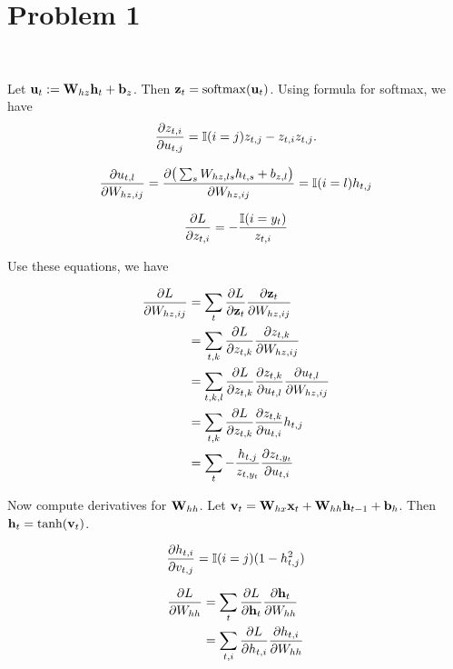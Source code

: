 \section{Problem 1}~\label{sec:prob1}

Let ${\mathbf{u}}_t:={\mathbf{W}}_{hz}{\mathbf{h}}_t+{\mathbf{b}}_z$.
Then ${\mathbf{z}}_t={\mathop{\mathrm{softmax}}}({\mathbf{u}}_t)$.
Using formula for softmax, we have
\begin{equation}
    \frac{\partial z_{t,i}}{\partial u_{t,j}} = {\mathbb{I}}(i=j)z_{t,j}-z_{t,i}z_{t,j}.
\end{equation}

\begin{equation}
    \frac{\partial u_{t,l}}{\partial W_{hz,ij}}
        = \frac{\partial \big(\sum_s W_{hz,ls}h_{t,s}+b_{z,l}\big)}{\partial W_{hz,ij}}
        = {\mathbb{I}}(i=l)h_{t,j}
\end{equation}

\begin{equation}
    \frac{\partial L}{\partial z_{t,i}}= -\frac{{\mathbb{I}}(i=y_t)}{z_{t,i}}
\end{equation}

Use these equations, we have

\begin{equation}
\begin{split}
    \frac{\partial L}{\partial W_{hz,ij}}
        &= \sum_t \frac{\partial L}{\partial {\mathbf{z}}_t} \frac{\partial {\mathbf{z}}_t}{\partial W_{hz,ij}} \\
        &= \sum_{t,k} \frac{\partial L}{\partial z_{t,k}} \frac{\partial z_{t,k}}{\partial W_{hz,ij}} \\
        &= \sum_{t,k,l} \frac{\partial L}{\partial z_{t,k}} \frac{\partial z_{t,k}}{\partial u_{t,l}}\frac{\partial u_{t,l}}{\partial W_{hz,ij}} \\
        &= \sum_{t,k} \frac{\partial L}{\partial z_{t,k}} \frac{\partial z_{t,k}}{\partial u_{t,i}}h_{t,j} \\
        &= \sum_{t} -\frac{h_{t,j}}{z_{t,y_t}} \frac{\partial z_{t,{y_t}}}{\partial u_{t,i}} \\
\end{split}
\end{equation}

Now compute derivatives for ${\mathbf{W}}_{hh}$.
Let ${\mathbf{v}}_t={\mathbf{W}}_{hx}{\mathbf{x}}_t+{\mathbf{W}}_{hh}{\mathbf{h}}_{t-1}+{\mathbf{b}}_h$.
Then ${\mathbf{h}}_t=\tanh({\mathbf{v}}_t)$.

\begin{equation}
    \frac{\partial h_{t,i}}{\partial v_{t,j}} = {\mathbb{I}}(i=j)(1-h_{t,j}^2)
\end{equation}

\begin{equation}
\begin{split}
    \frac{\partial L}{\partial W_{hh}}
        &= \sum_t \frac{\partial L}{\partial {\mathbf{h}}_t} \frac{\partial {\mathbf{h}}_t}{\partial W_{hh}} \\
        &= \sum_{t,i} \frac{\partial L}{\partial h_{t,i}} \frac{\partial h_{t,i}}{\partial W_{hh}} \\
\end{split}
\end{equation}
